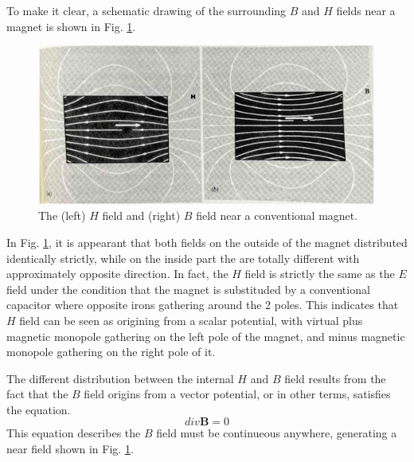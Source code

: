 To make it clear, a schematic drawing of the surrounding $B$ and $H$ fields near a magnet is shown in Fig. \ref{fig:BandH}.
\begin{figure}[H]
  \includegraphics[width=18cm, bb=9 9 900 550]{./section2Proposal/BandH.JPEG}
  \caption{The (left) $H$ field and (right) $B$ field near a conventional magnet.}
  \label{fig:BandH}
\end{figure}
In Fig. \ref{fig:BandH}, it is appearant that both fields on the outside of the magnet distributed identically strictly,
while on the inside part the are totally different with approximately opposite direction.
In fact, the $H$ field is strictly the same as the $E$ field under the condition that the magnet is substituded by a conventional capacitor where opposite irons gathering around the 2 poles.
This indicates that $H$ field can be seen as origining from a scalar potential,
with virtual plus magnetic monopole gathering on the left pole of the magnet,
and minus magnetic monopole gathering on the right pole of it.

The different distribution between the internal $H$ and $B$ field results from the fact that
the $B$ field origins from a vector potential,
or in other terms,
satisfies the equation.
\begin{equation}
  div\mathbf{B} = 0\nonumber
\end{equation}
This equation describes the $B$ field must be continueous anywhere,
generating a near field shown in Fig. \ref{fig:BandH}.

